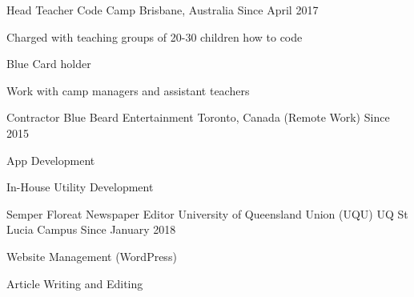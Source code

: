 


\begin{cventries}


\cventry
{Head Teacher} %
{Code Camp} %
{Brisbane, Australia} %
{Since April 2017} %
{ %
\begin{cvitems}
\item {Charged with teaching groups of 20-30 children how to code}
\item {Blue Card holder}
\item {Work with camp managers and assistant teachers}
\end{cvitems}
}


\cventry
{Contractor} %
{Blue Beard Entertainment} %
{Toronto, Canada (Remote Work)} %
{Since 2015} %
{ %
\begin{cvitems}
\item {App Development}
\item {In-House Utility Development}
\end{cvitems}
}


\cventry
{Semper Floreat Newspaper Editor} %
{University of Queensland Union (UQU)} %
{UQ St Lucia Campus} %
{Since January 2018} %
{ %
\begin{cvitems}
\item {Website Management (WordPress)}
\item {Article Writing and Editing}
\end{cvitems}
}


\end{cventries}